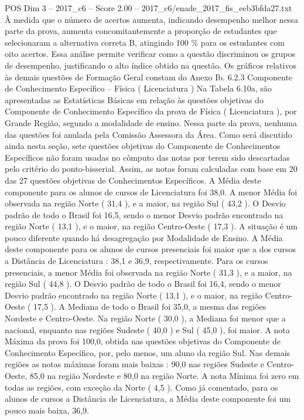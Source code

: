 \begin{textsample}{POS Dim 3 – 2017\_c6 – Score 2.00 – 2017\_c6/enade\_2017\_fis\_eeb3bfda27.txt}
À medida que o número de acertos aumenta, indicando desempenho melhor nessa parte da prova, aumenta concomitantemente a proporção de estudantes que selecionaram a alternativa correta B, atingindo 100 \% para os estudantes com oito acertos.
Essa análise permite verificar como a questão discriminou os grupos de desempenho, justificando o alto índice obtido na questão.
Os gráficos relativos às demais questões de Formação Geral constam do Anexo Ib. 6.2.3 Componente de Conhecimento Específico – Física ( Licenciatura ) Na Tabela 6.10a, são apresentadas as Estatísticas Básicas em relação às questões objetivas do Componente de Conhecimento Específico da prova de Física ( Licenciatura ), por Grande Região, segundo a modalidade de ensino.
Nessa parte da prova, nenhuma das questões foi anulada pela Comissão Assessora da Área.
Como será discutido ainda nesta seção, sete questões objetivas do Componente de Conhecimentos Específicos não foram usadas no cômputo das notas por terem sido descartadas pelo critério do ponto-bisserial.
Assim, as notas foram calculadas com base em 20 das 27 questões objetivas de Conhecimentos Específicos.
A Média deste componente para os alunos de cursos de Licenciatura foi 38,0.
A menor Média foi observada na região Norte ( 31,4 ), e a maior, na região Sul ( 43,2 ).
O Desvio padrão de todo o Brasil foi 16,5, sendo o menor Desvio padrão encontrado na região Norte ( 13,1 ), e o maior, na região Centro-Oeste ( 17,3 ).
A situação é um pouco diferente quando há desagregação por Modalidade de Ensino.
A Média deste componente para os alunos de cursos presenciais foi maior que a dos cursos a Distância de Licenciatura : 38,1 e 36,9, respectivamente.
Para os cursos presenciais, a menor Média foi observada na região Norte ( 31,3 ), e a maior, na região Sul ( 44,8 ).
O Desvio padrão de todo o Brasil foi 16,4, sendo o menor Desvio padrão encontrado na região Norte ( 13,1 ), e o maior, na região Centro-Oeste ( 17,5 ).
A Mediana de todo o Brasil foi 35,0, a mesma das regiões Nordeste e Centro-Oeste.
Na região Norte ( 30,0 ), a Mediana foi menor que a nacional, enquanto nas regiões Sudeste ( 40,0 ) e Sul ( 45,0 ), foi maior.
A nota Máxima da prova foi 100,0, obtida nas questões objetivas do Componente de Conhecimento Específico, por, pelo menos, um aluno da região Sul.
Nas demais regiões as notas máximas foram mais baixas : 90,0 nas regiões Sudeste e Centro-Oeste, 85,0 na região Nordeste e 80,0 na região Norte.
A nota Mínima foi zero em todas as regiões, com exceção da Norte ( 4,5 ).
Como já comentado, para os alunos de cursos a Distância de Licenciatura, a Média deste componente foi um pouco mais baixa, 36,9.

\end{textsample}
